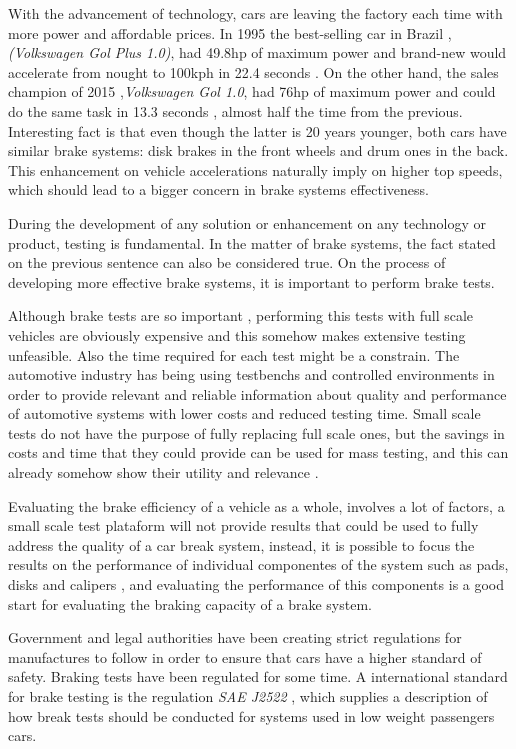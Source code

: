 	With the advancement of technology, cars are leaving the factory each time with more power and affordable prices. In 1995 the best-selling car in Brazil \cite{lideres-vendas-brasil}, \textit{(Volkswagen Gol Plus 1.0)}, had 49.8hp of maximum power and brand-new would accelerate from nought to 100kph in 22.4 seconds \cite{cnwgol1993}. On the other hand, the sales champion of 2015 ,\textit{Volkswagen Gol 1.0}, had 76hp of maximum power and could do the same task in 13.3 seconds \cite{cnwgol2013}, almost half the time from the previous. Interesting fact is that even though the latter is 20 years younger, both cars have similar brake systems: disk brakes in the front wheels and drum ones in the back. This enhancement on vehicle accelerations naturally imply on higher top speeds, which should lead to a bigger concern in brake systems effectiveness.
	\par
	During the development of any solution or enhancement on any technology or product, testing is fundamental. In the matter of brake systems, the fact stated on the previous sentence can also be considered true. On the process of developing more effective brake systems, it is important to perform brake tests.
	\par
	Although brake tests are so important \cite{abendroth1985new}, performing this tests with full scale vehicles are obviously expensive and this somehow makes extensive testing unfeasible. Also the time required for each test might be a constrain. The automotive industry has being using testbenchs and controlled environments in order to provide relevant and reliable information about quality and performance of automotive systems with lower costs and reduced testing time. Small scale tests do not have the purpose of fully replacing full scale ones, but the savings in costs and time that they could provide can be used for mass testing, and this can already somehow show their utility and relevance \cite{gardinalli2005comparaccao}. 
	\par
	Evaluating the brake efficiency of a vehicle as a whole, involves a lot of factors, a small scale test plataform will not provide results that could be used to fully address the quality of a car break system, instead, it is possible to focus the results on the performance of individual componentes of the system such as pads, disks and calipers \cite{halderman2016automotive}, and evaluating the performance of this components is a good start for evaluating the braking capacity of a brake system.
	\par
	Government and legal authorities have been creating strict regulations for manufactures to follow in order to ensure that cars have a higher standard of safety. Braking tests have been regulated for some time. A international standard for brake testing is the regulation \textit{SAE J2522} \cite{sae}, which supplies a description of how break tests should be conducted for systems used in low weight passengers cars.
